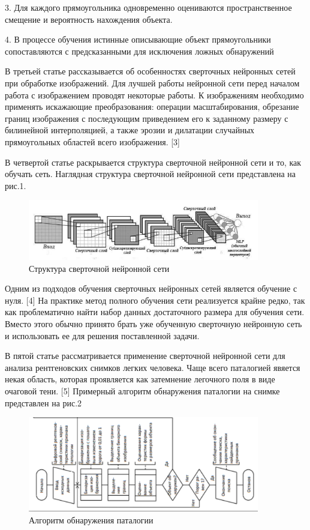 \documentclass{svproc}
\begin{document}
3. Для каждого прямоугольника одновременно оцениваются пространственное смещение и вероятность
нахождения объекта.

4. В процессе обучения истинные описывающие
объект прямоугольники сопоставляются с предсказанными для исключения ложных обнаружений

В третьей статье рассказывается об особенностях сверточных нейронных сетей при обработке изображений. Для лучшей работы нейронной сети перед началом работа с изображением проводят некоторые работы. К изображениям необходимо применять искажающие преобразования: операции
масштабирования, обрезание границ изображения с последующим приведением его к
заданному размеру с билинейной интерполяцией, а также эрозии и дилатации случайных
прямоугольных областей всего изображения. [3]

В четвертой статье раскрывается структура сверточной нейронной сети и то, как обучать сеть. Наглядная структура сверточной нейронной сети представлена на рис.1.

\begin{figure}[h]
    \centering
    \includegraphics[width=0.90\textwidth]{picture_1}
    \caption{Структура сверточной нейронной сети}
    \label{fig:picture_1}
\end{figure}

Одним из подходов обучения сверточных
нейронных сетей является обучение с нуля. [4] На практике метод полного обучения сети реализуется крайне редко, так как проблематично
найти набор данных достаточного размера для обучения сети. Вместо этого обычно принято брать
уже обученную сверточную нейронную сеть и использовать ее для решения поставленной задачи.

В пятой статье рассматривается применение сверточной нейронной сети для анализа рентгеновских снимков легких человека. Чаще всего паталогией явяется некая область, которая проявляется как затемнение легочного поля в виде очаговой тени. [5] Примерный алгоритм обнаружения паталогии на снимке представлен на рис.2

\begin{figure}[h]
    \centering
    \includegraphics[width=0.90\textwidth]{picture_2}
    \caption{Алгоритм обнаружения паталогии}
    \label{fig:picture_2}
\end{figure}
\end{document}

